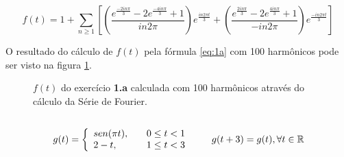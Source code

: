 \begin{equation}\displaystyle
  f(t) = 1+ \sum\limits_{n \ge 1} \left[ \left( \frac{e^{\frac{-2 i n \pi}{3}} -2 e^{\frac{-4 i n \pi}{3}} + 1}{i n 2 \pi} \right) e^{\frac{i n 2 \pi t}{3}} + \left( \frac{e^{\frac{2 i n \pi}{3}} -2 e^{\frac{4 i n \pi}{3}} + 1}{-i n 2 \pi} \right) e^{\frac{-i n 2 \pi t}{3}} \right]
  \label{eq:1a}
\end{equation}

O resultado do cálculo de $f(t)$ pela fórmula \eqref{eq:1a} com 100 harmônicos pode ser visto na figura \ref{fig:1a-ffs}.

\begin{figure}
  \caption{\small{$f(t)$ do exercício \textbf{1.a} calculada com 100 harmônicos através do cálculo da Série de Fourier.}}
  \label{fig:1a-ffs}
\end{figure}


\subsection{}

\begin{equation}\displaystyle
g(t) = \left\{ 
\begin{array}{l l}
  sen(\pi t), & \quad 0 \le t < 1 \\
  2 - t, & \quad 1 \le t < 3
\end{array} \right. \quad \quad g(t+3) = g(t), \forall t \in \mathbb{R}
\end{equation}

